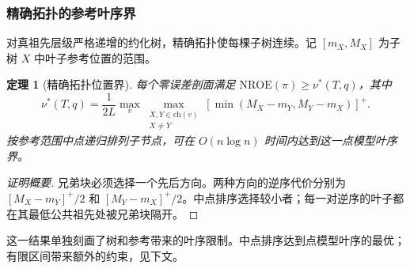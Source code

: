 \documentclass[fontset=none,zihao=5,a4paper]{ctexart}
\newtheorem{theorem}{定理}
\newcommand{\nroe}{\mathrm{NROE}}
\begin{document}
\subsubsection{精确拓扑的参考叶序界}
对真祖先层级严格递增的约化树，精确拓扑使每棵子树连续。记 $[m_X,M_X]$ 为子树 $X$ 中叶子参考位置的范围。
\begin{theorem}[精确拓扑位置界]\label{thm:order}
每个零误差剖面满足 $\nroe(\pi)\ge\nu^*(T,q)$，其中
\begin{equation}\label{eq:nu}
 \nu^*(T,q)=\frac{1}{2L}\max_v\max_{\substack{X,Y\in\mathrm{ch}(v)\\X\ne Y}}
 [\min(M_X-m_Y,M_Y-m_X)]^+.
\end{equation}
按参考范围中点递归排列子节点，可在 $O(n\log n)$ 时间内达到这一点模型叶序界。
\end{theorem}
\begin{proof}[证明概要]
兄弟块必须选择一个先后方向。两种方向的逆序代价分别为 $[M_X-m_Y]^+/2$ 和 $[M_Y-m_X]^+/2$。中点排序选择较小者；每一对逆序的叶子都在其最低公共祖先处被兄弟块隔开。
\end{proof}
这一结果单独刻画了树和参考带来的叶序限制。中点排序达到点模型叶序的最优；有限区间带来额外的约束，见下文。
\end{document}
